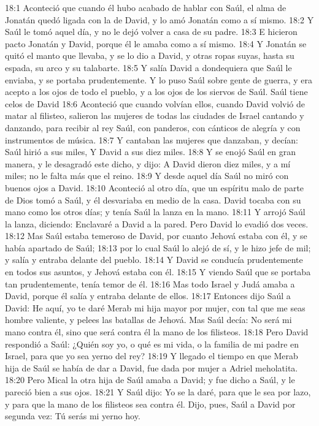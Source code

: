 18:1 Aconteció que cuando él hubo acabado de hablar con Saúl, el alma de Jonatán quedó ligada con la de David, y lo amó Jonatán como a sí mismo.  
18:2 Y Saúl le tomó aquel día, y no le dejó volver a casa de su padre.  
18:3 E hicieron pacto Jonatán y David, porque él le amaba como a sí mismo.  
18:4 Y Jonatán se quitó el manto que llevaba, y se lo dio a David, y otras ropas suyas, hasta su espada, su arco y su talabarte.  
18:5 Y salía David a dondequiera que Saúl le enviaba, y se portaba prudentemente. Y lo puso Saúl sobre gente de guerra, y era acepto a los ojos de todo el pueblo, y a los ojos de los siervos de Saúl.  
Saúl tiene celos de David  
18:6 Aconteció que cuando volvían ellos, cuando David volvió de matar al filisteo, salieron las mujeres de todas las ciudades de Israel cantando y danzando, para recibir al rey Saúl, con panderos, con cánticos de alegría y con instrumentos de música.  
18:7 Y cantaban las mujeres que danzaban, y decían:  
Saúl hirió a sus miles,  
Y David a sus diez miles. 
18:8 Y se enojó Saúl en gran manera, y le desagradó este dicho, y dijo: A David dieron diez miles, y a mí miles; no le falta más que el reino.  
18:9 Y desde aquel día Saúl no miró con buenos ojos a David. 
18:10 Aconteció al otro día, que un espíritu malo de parte de Dios tomó a Saúl, y él desvariaba en medio de la casa. David tocaba con su mano como los otros días; y tenía Saúl la lanza en la mano.  
18:11 Y arrojó Saúl la lanza, diciendo: Enclavaré a David a la pared. Pero David lo evadió dos veces.  
18:12 Mas Saúl estaba temeroso de David, por cuanto Jehová estaba con él, y se había apartado de Saúl;  
18:13 por lo cual Saúl lo alejó de sí, y le hizo jefe de mil; y salía y entraba delante del pueblo.  
18:14 Y David se conducía prudentemente en todos sus asuntos, y Jehová estaba con él.  
18:15 Y viendo Saúl que se portaba tan prudentemente, tenía temor de él.  
18:16 Mas todo Israel y Judá amaba a David, porque él salía y entraba delante de ellos.  
18:17 Entonces dijo Saúl a David: He aquí, yo te daré Merab mi hija mayor por mujer, con tal que me seas hombre valiente, y pelees las batallas de Jehová. Mas Saúl decía: No será mi mano contra él, sino que será contra él la mano de los filisteos.  
18:18 Pero David respondió a Saúl: ¿Quién soy yo, o qué es mi vida, o la familia de mi padre en Israel, para que yo sea yerno del rey?  
18:19 Y llegado el tiempo en que Merab hija de Saúl se había de dar a David, fue dada por mujer a Adriel meholatita.  
18:20 Pero Mical la otra hija de Saúl amaba a David; y fue dicho a Saúl, y le pareció bien a sus ojos.  
18:21 Y Saúl dijo: Yo se la daré, para que le sea por lazo, y para que la mano de los filisteos sea contra él. Dijo, pues, Saúl a David por segunda vez: Tú serás mi yerno hoy.  
